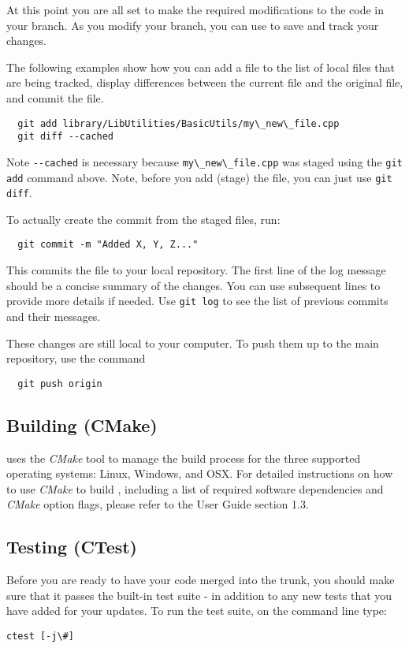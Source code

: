 \begin{itemize}
  At this point you are all set to make the required modifications to the 
  code in your branch.  As you modify your branch, you can use {\GIT} to
  save and track your changes.

  The following examples show how you can add a file to the list of local
  files that are being tracked, display differences between the current
  file and the original file, and commit the file.  
  \begin{lstlisting}
  git add library/LibUtilities/BasicUtils/my\_new\_file.cpp
  git diff --cached
  \end{lstlisting}

  Note \lstinline{--cached} is necessary because \lstinline{my\_new\_file.cpp} was staged using
  the \lstinline{git add} command above.  Note, before you add (stage) the
  file, you can just use \lstinline{git diff}.
  
  To actually create the commit from the staged files, run:
  \begin{lstlisting}
  git commit -m "Added X, Y, Z..."
  \end{lstlisting}
  This commits the file to your local repository. The first line of the log message should be a concise summary of the changes. You can use subsequent lines to provide more details if needed. Use \lstinline{git log} to see the list of previous commits and their messages.
  
  These changes are still local to your computer. To push them up to the main {\nek} repository, use the command
  \begin{lstlisting}
  git push origin
  \end{lstlisting}
\end{itemize}

\subsection{Building (CMake)}

{\nek} uses the \emph{CMake} tool to manage the build process for
the three supported operating systems: Linux, Windows, and OSX.  For
detailed instructions on how to use \emph{CMake} to build {\nek},
including a list of required software dependencies and \emph{CMake}
option flags, please refer to the {\nek} User Guide section 1.3.

\subsection{Testing (CTest)}
Before you are ready to have your code merged into the {\nek}
trunk, you should make sure that it passes the built-in test suite -
in addition to any new tests that you have added for your
updates. To run the test suite, on the command line type:
\begin{lstlisting}  
ctest [-j\#]
\end{lstlisting}
  
